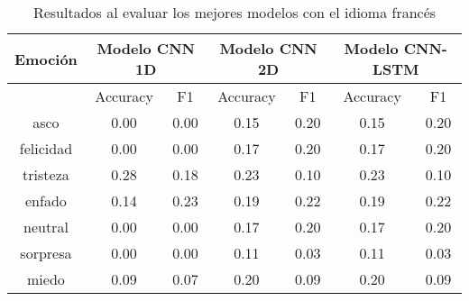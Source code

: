 \documentclass[11pt,a4paper,spanish]{book}
\begin{document}
	\begin{table}[H]
		\centering
		\begin{center}
			\begin{tabular}{| c|| c c |  c c |  c c | }
				\hline
				\multicolumn{1}{|c||}{Emoción} & 
				\multicolumn{2}{|c|}{Modelo CNN 1D}&
				\multicolumn{2}{|c|}{Modelo CNN 2D} &
				\multicolumn{2}{|c|}{Modelo CNN-LSTM} \\
				
				\hline
				& 
				\multicolumn{1}{|c|}{Accuracy}&\multicolumn{1}{|c|}{F1}&
				\multicolumn{1}{|c|}{Accuracy}&\multicolumn{1}{|c|}{F1}&
				\multicolumn{1}{|c|}{Accuracy}&\multicolumn{1}{|c|}{F1}\\
				\hline
				
				asco 		& 0.00 & 0.00 & 0.15 & 0.20 & 0.15 & 0.20 \\
				felicidad 	& 0.00 & 0.00 & 0.17 & 0.20 & 0.17 & 0.20 \\
				tristeza 	& 0.28 & 0.18 & 0.23 & 0.10 & 0.23 & 0.10 \\
				enfado 		& 0.14 & 0.23 & 0.19 & 0.22 & 0.19 & 0.22 \\
				neutral 	& 0.00 & 0.00 & 0.17 & 0.20 & 0.17 & 0.20 \\
				sorpresa 	& 0.00 & 0.00 & 0.11 & 0.03 & 0.11 & 0.03 \\
				miedo 		& 0.09 & 0.07 & 0.20 & 0.09 & 0.20 & 0.09 \\
				\hline
			\end{tabular}
			
			\caption{Resultados al evaluar los mejores modelos con el idioma francés}
			\label{results_TestFrench}
		\end{center}
	\end{table}

		
		
		
		
		
		
		

	\printbibliography
	
\end{document}
